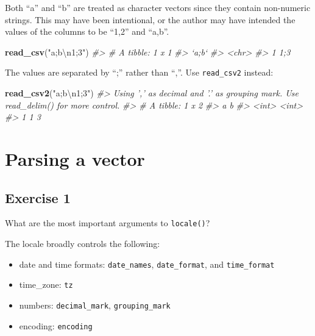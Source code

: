 \documentclass[]{book}
\newenvironment{Shaded}{\begin{snugshade}}{\end{snugshade}}
\newcommand{\CharTok}[1]{\textcolor[rgb]{0.31,0.60,0.02}{#1}}
\newcommand{\CommentTok}[1]{\textcolor[rgb]{0.56,0.35,0.01}{\textit{#1}}}
\newcommand{\KeywordTok}[1]{\textcolor[rgb]{0.13,0.29,0.53}{\textbf{#1}}}
\newcommand{\NormalTok}[1]{#1}
\newcommand{\StringTok}[1]{\textcolor[rgb]{0.31,0.60,0.02}{#1}}
\providecommand{\tightlist}{%
  \setlength{\itemsep}{0pt}\setlength{\parskip}{0pt}}
\theoremstyle{plain}
\theoremstyle{remark}
\theoremstyle{definition}
\theoremstyle{definition}
\theoremstyle{definition}
\theoremstyle{remark}
\begin{document}
Both ``a'' and ``b'' are treated as character vectors since they contain
non-numeric strings. This may have been intentional, or the author may
have intended the values of the columns to be ``1,2'' and ``a,b''.

\begin{Shaded}
\begin{Highlighting}[]
\KeywordTok{read_csv}\NormalTok{(}\StringTok{"a;b}\CharTok{\textbackslash{}n}\StringTok{1;3"}\NormalTok{)}
\CommentTok{#> # A tibble: 1 x 1}
\CommentTok{#>   `a;b`}
\CommentTok{#>   <chr>}
\CommentTok{#> 1 1;3}
\end{Highlighting}
\end{Shaded}

The values are separated by ``;'' rather than ``,''. Use
\texttt{read\_csv2} instead:

\begin{Shaded}
\begin{Highlighting}[]
\KeywordTok{read_csv2}\NormalTok{(}\StringTok{"a;b}\CharTok{\textbackslash{}n}\StringTok{1;3"}\NormalTok{)}
\CommentTok{#> Using ',' as decimal and '.' as grouping mark. Use read_delim() for more control.}
\CommentTok{#> # A tibble: 1 x 2}
\CommentTok{#>       a     b}
\CommentTok{#>   <int> <int>}
\CommentTok{#> 1     1     3}
\end{Highlighting}
\end{Shaded}

\hypertarget{parsing-a-vector}{%
\section{Parsing a vector}\label{parsing-a-vector}}

\hypertarget{exercise-1-20}{%
\subsection{Exercise 1}\label{exercise-1-20}}

What are the most important arguments to \texttt{locale()}?

The locale broadly controls the following:

\begin{itemize}
\tightlist
\item
  date and time formats: \texttt{date\_names}, \texttt{date\_format},
  and \texttt{time\_format}
\item
  time\_zone: \texttt{tz}
\item
  numbers: \texttt{decimal\_mark}, \texttt{grouping\_mark}
\item
  encoding: \texttt{encoding}
\end{itemize}
\end{document}

